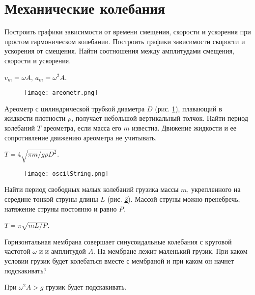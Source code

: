 \section{Механические колебания}

\introProblems

\begin{ex} %
Построить графики зависимости от времени смещения, скорости и ускорения при простом гармоническом колебании. Построить графики зависимости скорости и ускорения от смещения. Найти соотношения между амплитудами смещения, скорости и ускорения.
\begin{ans}
$v_m = \omega A$, $a_m = \omega^2 A$.
\end{ans}
\end{ex}	

\begin{figure}[h]
\centering
\texttt{[image: areometr.png]}
\caption{}
\label{areometr}
\end{figure}

\begin{ex} %
Ареометр с цилиндрической трубкой диаметра $D$ (рис. \ref{areometr}), плавающий в жидкости плотности $\rho$, получает небольшой вертикальный толчок. Найти период колебаний $T$ ареометра, если масса его $m$ известна. Движение жидкости и ее сопротивление движению ареометра не учитывать.
\begin{ans}
$T = 4 \sqrt{\pi m / g \rho D^2}$.
\end{ans}
\end{ex}	

\begin{figure}[h]
\centering
\texttt{[image: oscilString.png]}
\caption{}
\label{oscilString}
\end{figure}

\begin{ex} %
Найти период свободных малых колебаний грузика массы $m$, укрепленного на середине тонкой струны длины $L$ (рис. \ref{oscilString}). Массой струны можно пренебречь; натяжение струны постоянно и равно $P$.
\begin{ans}
$T = \pi \sqrt{m L /P}$.
\end{ans}
\end{ex}	

\begin{ex} %
Горизонтальная мембрана совершает синусоидальные колебания с круговой частотой $\omega$ и и амплитудой $A$. На мембране лежит маленький грузик. При каком условии грузик будет колебаться вместе с мембраной и при каком он начнет подскакивать?
\begin{ans}
При $\omega^2 A > g$ грузик будет подскакивать.
\end{ans}
\end{ex}	

